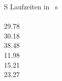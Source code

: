 \begin{table}
\centering
\caption{Messdaten zu dem Durchschallungsverfahren. Die Messdaten sind der Reihe nach den Zylindern 1 - 7 zuzuordnen.}
\label{tab:durchschall}
\begin{tabular}{S }
\toprule
{Laufzeiten in \si{\mu\second}}  \\
\\
29.78\\
30.18\\
38.48\\
11.98\\
15.21\\
23.27\\
\bottomrule
\end{tabular}
\end{table}
